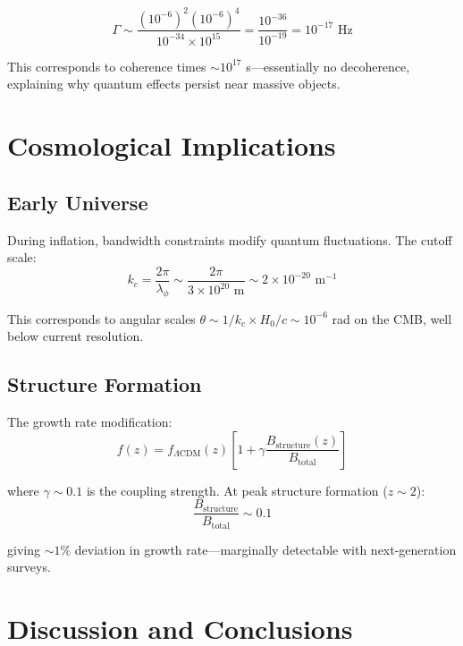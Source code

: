 \documentclass[twocolumn,prd,amsmath,amssymb,aps,superscriptaddress,nofootinbib]{revtex4-2}
\begin{document}
\begin{equation}
\Gamma \sim \frac{(10^{-6})^2 (10^{-6})^4}{10^{-34} \times 10^{15}} = \frac{10^{-36}}{10^{-19}} = 10^{-17} \text{ Hz}
\end{equation}

This corresponds to coherence times $\sim 10^{17}$ s---essentially no decoherence, explaining why quantum effects persist near massive objects.

\section{Cosmological Implications}
\label{sec:cosmology}

\subsection{Early Universe}

During inflation, bandwidth constraints modify quantum fluctuations. The cutoff scale:
\begin{equation}
k_c = \frac{2\pi}{\lambda_\phi} \sim \frac{2\pi}{3 \times 10^{20} \text{ m}} \sim 2 \times 10^{-20} \text{ m}^{-1}
\end{equation}

This corresponds to angular scales $\theta \sim 1/k_c \times H_0/c \sim 10^{-6}$ rad on the CMB, well below current resolution.

\subsection{Structure Formation}

The growth rate modification:
\begin{equation}
f(z) = f_{\Lambda\text{CDM}}(z)\left[1 + \gamma \frac{B_{\text{structure}}(z)}{B_{\text{total}}}\right]
\end{equation}

where $\gamma \sim 0.1$ is the coupling strength. At peak structure formation ($z \sim 2$):
\begin{equation}
\frac{B_{\text{structure}}}{B_{\text{total}}} \sim 0.1
\end{equation}

giving $\sim 1\%$ deviation in growth rate---marginally detectable with next-generation surveys.

\section{Discussion and Conclusions}
\label{sec:discussion}
\end{document}
